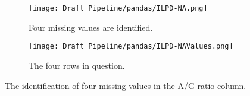 \begin{figure}[H]
    \centering
    \begin{subfigure}{0.75\textwidth}
        \centering
       \texttt{[image: Draft Pipeline/pandas/ILPD-NA.png]}
       \caption{Four missing values are identified.}
       \label{fig:NAs1} 
    \end{subfigure}
    
    \begin{subfigure}{1\textwidth}
        \centering
       \texttt{[image: Draft Pipeline/pandas/ILPD-NAValues.png]}
       \caption{The four rows in question.}
       \label{fig:NAs2}
    \end{subfigure}
    \caption{The identification of four missing values in the A/G ratio column.}
\end{figure}


